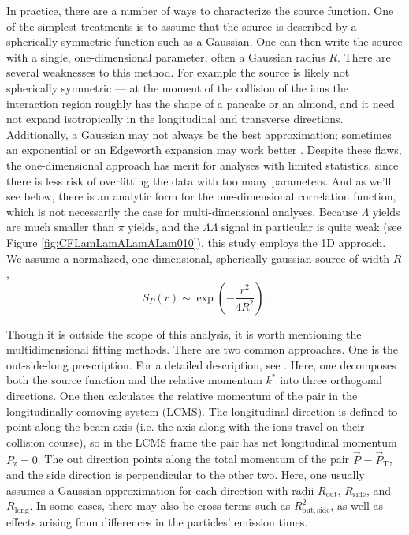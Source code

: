 In practice, there are a number of ways to characterize the source function.
One of the simplest treatments is to assume that the source is described by a spherically symmetric function such as a Gaussian.
One can then write the source with a single, one-dimensional parameter, often a Gaussian radius $R$.
There are several weaknesses to this method.
For example the source is likely not spherically symmetric --- at the moment of the collision of the ions the interaction region roughly has the shape of a pancake or an almond,
and it need not expand isotropically in the longitudinal and transverse directions.
Additionally, a Gaussian may not always be the best approximation; sometimes an exponential or an Edgeworth expansion may work better \cite{Abelev:2013pqa, Abelev:2014pja}.
Despite these flaws, the one-dimensional approach has merit for analyses with limited statistics, since there is less risk of overfitting the data with too many parameters.
And as we'll see below, there is an analytic form for the one-dimensional correlation function, which is not necessarily the case for multi-dimensional analyses.
Because $\Lambda$ yields are much smaller than $\pi$ yields, and the $\Lambda\Lambda$ signal in particular is quite weak (see Figure \ref{fig:CFLamLamALamALam010}), this study employs the 1D approach.
We assume a normalized, one-dimensional, spherically gaussian source of width $R$,
\begin{equation}
\label{eq:Gaussian1DSource}
S_P(r) \sim \exp{(-\frac{r^2}{4R^2})}.
\end{equation}

Though it is outside the scope of this analysis, it is worth mentioning the multidimensional fitting methods.
There are two common approaches.
One is the out-side-long prescription.
For a detailed description, see \cite{Lisa:2005dd}.
Here, one decomposes both the source function and the relative momentum $k^*$ into three orthogonal directions.
One then calculates the relative momentum of the pair in the longitudinally comoving system (LCMS).
The longitudinal direction is defined to point along the beam axis (i.e. the axis along with the ions travel on their collision course), so in the LCMS frame the pair has net longitudinal momentum $P_\mathrm{z} = 0$.
The out direction points along the total momentum of the pair $\vec{P}=\vec{P}_{\mathrm{T}}$, and the side direction is perpendicular to the other two.
Here, one usually assumes a Gaussian approximation for each direction with radii $R_\mathrm{out}$, $R_\mathrm{side}$, and $R_\mathrm{long}$.
In some cases, there may also be cross terms such as $R^2_{\mathrm{out,side}}$, as well as effects arising from differences in the particles' emission times.

